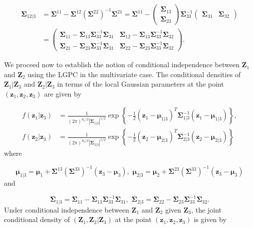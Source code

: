 \documentclass[
  12pt,
  letterpaper]{article}
\numberwithin{equation}{section}
\newcommand{\Z}{\bm{Z}}
\newcommand{\z}{\bm{z}}
\newcommand{\fmu}{\bm{\mu}}
\newcommand{\fSigma}{\bm{\Sigma}}
\begin{document}
\begin{align}
\fSigma_{12|3} &= \fSigma^{11} - \fSigma^{12}\left(\fSigma^{22}\right)^{-1}\fSigma^{21} = \fSigma^{11} - \begin{pmatrix} \fSigma_{13} \\ \fSigma_{23} \end{pmatrix} \fSigma_{33}^{-1} \begin{pmatrix} \fSigma_{31} & \fSigma_{32} \end{pmatrix}\nonumber \\
&= \begin{pmatrix} \fSigma_{11} - \fSigma_{13}\fSigma_{33}^{-1} \fSigma_{31} & \fSigma_{12} - \fSigma_{13}\fSigma_{33}^{-1} \fSigma_{32} \\ \fSigma_{21} - \fSigma_{23}\fSigma_{33}^{-1} \fSigma_{31} & \fSigma_{22} - \fSigma_{23}\fSigma_{33}^{-1} \fSigma_{32}\end{pmatrix}. 
\label{eq:blocksigma}
\end{align}

We proceed now to establish the notion of conditional independence between \(\Z_1\) and \(\Z_2\) using the LGPC in the multivariate case. The conditional densities of \(\Z_1|\Z_3\) and \(\Z_2|\Z_3\) in terms of the local Gaussian parameters at the point \((\z_1, \z_2, \z_3)\) are given by

\begin{align*}
f(\z_1 |\z_3) &= \frac{1}{(2\pi)^{d_1/2}|\fSigma_{1|3}|^{1/2}} \exp \left\{-\frac{1}{2}(\z_1 - \fmu_{1|3})^T\fSigma_{1|3}^{-1}(\z_1 - \fmu_{1|3})\right\}, \\
f(\z_2 |\z_3) &= \frac{1}{(2\pi)^{d_2/2}|\fSigma_{2|3}|^{1/2}} \exp \left\{-\frac{1}{2}(\z_2 - \fmu_{2|3})^T\fSigma_{2|3}^{-1}(\z_2 - \fmu_{2|3})\right\} 
\end{align*}
where

\begin{equation}
\fmu_{1|3} = \fmu_1 + \fSigma^{13}\left(\fSigma^{33}\right)^{-1}\left(\z_3 - \fmu_3\right), \,\, \fmu_{2|3} = \fmu_2 + \fSigma^{23}\left(\fSigma^{33}\right)^{-1}\left(\z_3 - \fmu_3\right)  
\end{equation}
and

\begin{equation}
\fSigma_{1|3} = \fSigma_{11}-\fSigma_{13}\fSigma_{33}^{-1}\fSigma_{31}, \,\, \fSigma_{2|3} = \fSigma_{22}-\fSigma_{23}\fSigma_{33}^{-1}\fSigma_{32}.
\label{eq:localsigma}
\end{equation}
Under conditional independence between \(\Z_1\) and \(\Z_2\) given \(\Z_3\), the joint conditional density of \((\Z_1, \Z_2|\Z_3)\) at the point \((\z_1, \z_2, \z_3)\) is given by
\end{document}
